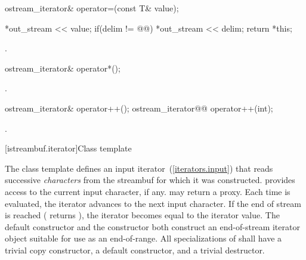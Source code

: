 %
%
\begin{itemdecl}
ostream_iterator& operator=(const T& value);
\end{itemdecl}

\begin{itemdescr}
\pnum
\effects {}
\begin{codeblock}
*out_stream << value;
if(delim != @@)
  *out_stream << delim;
return *this;
\end{codeblock}

{\color{oldclr}
\pnum
\requires {}.
} %
\end{itemdescr}

%
%
\begin{itemdecl}
ostream_iterator& operator*();
\end{itemdecl}

\begin{itemdescr}
\pnum
\returns
{}.
\end{itemdescr}

%
%
\begin{itemdecl}
ostream_iterator& operator++();
ostream_iterator@\removed{\&}@ operator++(int);
\end{itemdecl}

\begin{itemdescr}
\pnum
\returns
{}.
\end{itemdescr}

[istreambuf.iterator]{Class template }

\pnum
The
class template
defines an input iterator~(\ref{iterators.input}) that
reads successive
\textit{characters}
from the streambuf for which it was constructed.
provides access to the current input character, if any.
\enternote {} may return a proxy. \exitnote
Each time
is evaluated, the iterator advances to the next input character.
If the end of stream is reached ( returns
),
the iterator becomes equal to the
iterator value.
The default constructor
and the constructor
both construct an end-of-stream iterator object suitable for use
as an end-of-range.
All specializations of  shall have a trivial copy
constructor, a  default constructor, and a trivial destructor.

